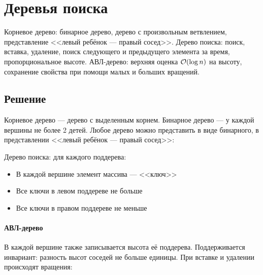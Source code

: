 \section{Деревья поиска}
Корневое дерево:
бинарное дерево,
дерево с произвольным ветвлением,
представление <<левый ребёнок --- правый сосед>>.
Дерево поиска: поиск, вставка, удаление,
поиск следующего и предыдущего элемента за время,
пропорциональное высоте.
АВЛ-дерево: верхняя оценка $\mathcal{O}(\log n)$ на высоту,
сохранение свойства при помощи малых и больших вращений.

\subsection{Решение}
Корневое дерево --- дерево с выделенным корнем.
Бинарное дерево --- у каждой вершины не более 2 детей.
Любое дерево можно представить в виде бинарного,
в представлении <<левый ребёнок --- правый сосед>>:

\begin{center}
\end{center}

Дерево поиска: для каждого поддерева:
\begin{itemize}
    \item В каждой вершине элемент массива --- <<ключ>>
    \item Все ключи в левом поддереве не больше
    \item Все ключи в правом поддереве не меньше
\end{itemize}

\paragraph{АВЛ-дерево}
В каждой вершине также записывается высота её поддерева.
Поддерживается инвариант: разность высот соседей не больше единицы.
При вставке и удалении происходят вращения:

